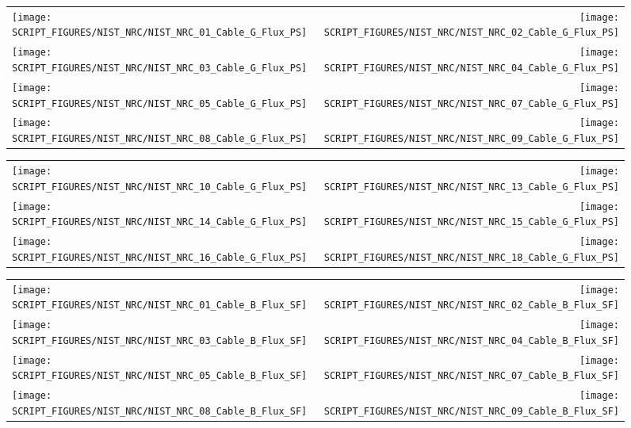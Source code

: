 \begin{figure}[!ht]
\begin{tabular*}{\textwidth}{l@{\extracolsep{\fill}}r}
\texttt{[image: SCRIPT\_FIGURES/NIST\_NRC/NIST\_NRC\_01\_Cable\_G\_Flux\_PS]} &
\texttt{[image: SCRIPT\_FIGURES/NIST\_NRC/NIST\_NRC\_02\_Cable\_G\_Flux\_PS]} \\
\texttt{[image: SCRIPT\_FIGURES/NIST\_NRC/NIST\_NRC\_03\_Cable\_G\_Flux\_PS]} &
\texttt{[image: SCRIPT\_FIGURES/NIST\_NRC/NIST\_NRC\_04\_Cable\_G\_Flux\_PS]} \\
\texttt{[image: SCRIPT\_FIGURES/NIST\_NRC/NIST\_NRC\_05\_Cable\_G\_Flux\_PS]} &
\texttt{[image: SCRIPT\_FIGURES/NIST\_NRC/NIST\_NRC\_07\_Cable\_G\_Flux\_PS]} \\
\texttt{[image: SCRIPT\_FIGURES/NIST\_NRC/NIST\_NRC\_08\_Cable\_G\_Flux\_PS]} &
\texttt{[image: SCRIPT\_FIGURES/NIST\_NRC/NIST\_NRC\_09\_Cable\_G\_Flux\_PS]}
\end{tabular*}
\end{figure}

\begin{figure}[!ht]
\begin{tabular*}{\textwidth}{l@{\extracolsep{\fill}}r}
\texttt{[image: SCRIPT\_FIGURES/NIST\_NRC/NIST\_NRC\_10\_Cable\_G\_Flux\_PS]} &
\texttt{[image: SCRIPT\_FIGURES/NIST\_NRC/NIST\_NRC\_13\_Cable\_G\_Flux\_PS]} \\
\texttt{[image: SCRIPT\_FIGURES/NIST\_NRC/NIST\_NRC\_14\_Cable\_G\_Flux\_PS]} &
\texttt{[image: SCRIPT\_FIGURES/NIST\_NRC/NIST\_NRC\_15\_Cable\_G\_Flux\_PS]} \\
\texttt{[image: SCRIPT\_FIGURES/NIST\_NRC/NIST\_NRC\_16\_Cable\_G\_Flux\_PS]} &
\texttt{[image: SCRIPT\_FIGURES/NIST\_NRC/NIST\_NRC\_18\_Cable\_G\_Flux\_PS]}
\end{tabular*}
\end{figure}

\begin{figure}[!ht]
\begin{tabular*}{\textwidth}{l@{\extracolsep{\fill}}r}
\texttt{[image: SCRIPT\_FIGURES/NIST\_NRC/NIST\_NRC\_01\_Cable\_B\_Flux\_SF]} &
\texttt{[image: SCRIPT\_FIGURES/NIST\_NRC/NIST\_NRC\_02\_Cable\_B\_Flux\_SF]} \\
\texttt{[image: SCRIPT\_FIGURES/NIST\_NRC/NIST\_NRC\_03\_Cable\_B\_Flux\_SF]} &
\texttt{[image: SCRIPT\_FIGURES/NIST\_NRC/NIST\_NRC\_04\_Cable\_B\_Flux\_SF]} \\
\texttt{[image: SCRIPT\_FIGURES/NIST\_NRC/NIST\_NRC\_05\_Cable\_B\_Flux\_SF]} &
\texttt{[image: SCRIPT\_FIGURES/NIST\_NRC/NIST\_NRC\_07\_Cable\_B\_Flux\_SF]} \\
\texttt{[image: SCRIPT\_FIGURES/NIST\_NRC/NIST\_NRC\_08\_Cable\_B\_Flux\_SF]} &
\texttt{[image: SCRIPT\_FIGURES/NIST\_NRC/NIST\_NRC\_09\_Cable\_B\_Flux\_SF]}
\end{tabular*}
\end{figure}

